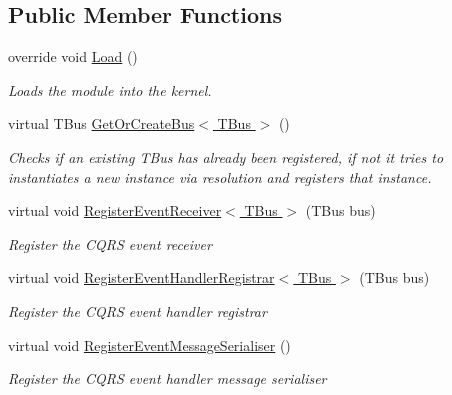 \subsection*{Public Member Functions}
\begin{DoxyCompactItemize}
\item 
override void \hyperlink{classCqrs_1_1Ninject_1_1Azure_1_1ServiceBus_1_1EventBus_1_1Configuration_1_1AzureEventBusReceiverModule_a806a400a3eec26d81ab200a425ef6121_a806a400a3eec26d81ab200a425ef6121}{Load} ()
\begin{DoxyCompactList}\small\item\em Loads the module into the kernel. \end{DoxyCompactList}\item 
virtual T\+Bus \hyperlink{classCqrs_1_1Ninject_1_1Azure_1_1ServiceBus_1_1EventBus_1_1Configuration_1_1AzureEventBusReceiverModule_a421f5ac0599f0d3d5be569cc954be73b_a421f5ac0599f0d3d5be569cc954be73b}{Get\+Or\+Create\+Bus$<$ T\+Bus $>$} ()
\begin{DoxyCompactList}\small\item\em Checks if an existing {\itshape T\+Bus}  has already been registered, if not it tries to instantiates a new instance via resolution and registers that instance. \end{DoxyCompactList}\item 
virtual void \hyperlink{classCqrs_1_1Ninject_1_1Azure_1_1ServiceBus_1_1EventBus_1_1Configuration_1_1AzureEventBusReceiverModule_a67b8ec2c2762bf04c0568bead3d03cbf_a67b8ec2c2762bf04c0568bead3d03cbf}{Register\+Event\+Receiver$<$ T\+Bus $>$} (T\+Bus bus)
\begin{DoxyCompactList}\small\item\em Register the C\+Q\+RS event receiver \end{DoxyCompactList}\item 
virtual void \hyperlink{classCqrs_1_1Ninject_1_1Azure_1_1ServiceBus_1_1EventBus_1_1Configuration_1_1AzureEventBusReceiverModule_ab80bf02927363075fc0be6cd180a3398_ab80bf02927363075fc0be6cd180a3398}{Register\+Event\+Handler\+Registrar$<$ T\+Bus $>$} (T\+Bus bus)
\begin{DoxyCompactList}\small\item\em Register the C\+Q\+RS event handler registrar \end{DoxyCompactList}\item 
virtual void \hyperlink{classCqrs_1_1Ninject_1_1Azure_1_1ServiceBus_1_1EventBus_1_1Configuration_1_1AzureEventBusReceiverModule_a240eed04165b4f23ca27aee357d44b28_a240eed04165b4f23ca27aee357d44b28}{Register\+Event\+Message\+Serialiser} ()
\begin{DoxyCompactList}\small\item\em Register the C\+Q\+RS event handler message serialiser \end{DoxyCompactList}\end{DoxyCompactItemize}


